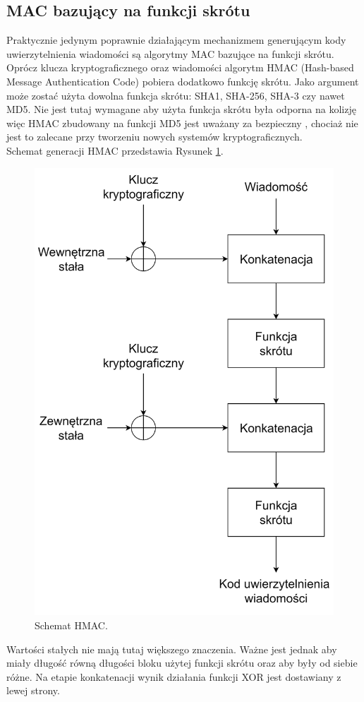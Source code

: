 \subsection{MAC bazujący na funkcji skrótu}
Praktycznie jedynym poprawnie działającym mechanizmem generującym kody uwierzytelnienia wiadomości są algorytmy
MAC bazujące na funkcji skrótu. 
Oprócz klucza kryptograficznego oraz wiadomości algorytm HMAC (Hash-based Message Authentication Code) pobiera dodatkowo funkcję skrótu. 
Jako argument może zostać użyta dowolna funkcja skrótu: SHA1, SHA-256, SHA-3 czy nawet MD5. 
Nie jest tutaj wymagane aby użyta funkcja skrótu była odporna na kolizję więc HMAC zbudowany na
funkcji MD5 jest uważany za bezpieczny \cite{hmacmd5}, chociaż nie jest to zalecane przy tworzeniu nowych systemów kryptograficznych. \\
Schemat generacji HMAC przedstawia Rysunek \ref{hmac-scheme}.
\begin{figure}[t]
    \centering
	\includegraphics[width=\textwidth, height=\textheight/2, keepaspectratio]{content/images/hmac}
    \caption{Schemat HMAC.}
    \label{hmac-scheme}
\end{figure} 
\noindent
Wartości stałych nie mają tutaj większego znaczenia. Ważne jest jednak aby miały długość równą długości bloku
użytej funkcji skrótu oraz aby były od siebie różne. 
Na etapie konkatenacji wynik działania funkcji XOR jest dostawiany z lewej strony.

